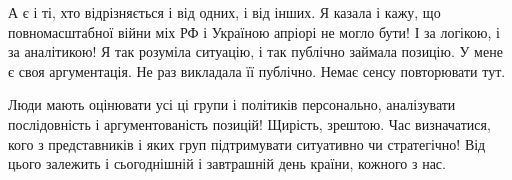 А є і ті, хто відрізняється і від одних, і від інших.  Я казала і кажу, що
повномасштабної війни міх РФ і Україною апріорі не могло бути! І за логікою, і
за аналітикою! Я так розуміла ситуацію, і так публічно займала позицію. У мене
є своя аргументація. Не раз викладала її публічно. Немає сенсу повторювати тут. 

Люди мають оцінювати усі ці групи  і політиків персонально, аналізувати
послідовність і аргументованість позицій! Щирість, зрештою. Час визначатися,
кого з представників і яких груп підтримувати ситуативно чи стратегічно! Від
цього залежить і сьогоднішній і завтрашній день країни, кожного з нас.

